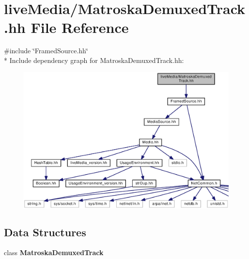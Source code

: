 \section{live\+Media/\+Matroska\+Demuxed\+Track.hh File Reference}
\label{MatroskaDemuxedTrack_8hh}
{\ttfamily \#include \char`\"{}Framed\+Source.\+hh\char`\"{}}\\*
Include dependency graph for Matroska\+Demuxed\+Track.\+hh\+:
\nopagebreak
\begin{figure}[H]
\begin{center}
\leavevmode
\includegraphics[width=350pt]{MatroskaDemuxedTrack_8hh__incl}
\end{center}
\end{figure}
\subsection*{Data Structures}
\begin{DoxyCompactItemize}
\item 
class {\bf Matroska\+Demuxed\+Track}
\end{DoxyCompactItemize}
